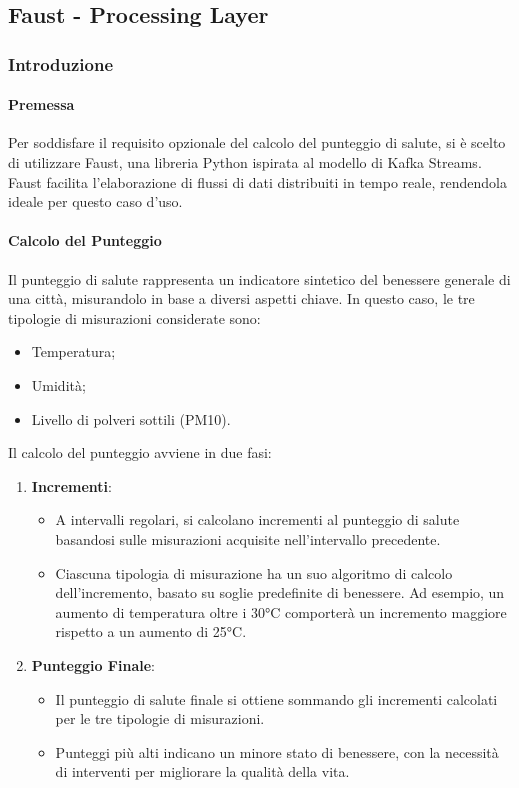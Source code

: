 \subsection{Faust - Processing Layer}
\subsubsection{Introduzione}
\paragraph*{Premessa}

Per soddisfare il requisito opzionale del calcolo del punteggio di salute, si è scelto di utilizzare Faust, una libreria Python ispirata al modello di Kafka Streams. Faust facilita l'elaborazione di flussi di dati distribuiti in tempo reale, rendendola ideale per questo caso d'uso.

\paragraph*{Calcolo del Punteggio}
Il punteggio di salute rappresenta un indicatore sintetico del benessere generale di una città, misurandolo in base a diversi aspetti chiave. In questo caso, le tre tipologie di misurazioni considerate sono:
\begin{itemize}
    \item Temperatura;
    \item Umidità;
    \item Livello di polveri sottili (PM10).
\end{itemize}

Il calcolo del punteggio avviene in due fasi:
\begin{enumerate}
    \item \textbf{Incrementi}: 
    \begin{itemize}
        \item A intervalli regolari, si calcolano incrementi al punteggio di salute basandosi sulle misurazioni acquisite nell'intervallo precedente.
        \item Ciascuna tipologia di misurazione ha un suo algoritmo di calcolo dell'incremento, basato su soglie predefinite di benessere. Ad esempio, un aumento di temperatura oltre i 30°C comporterà un incremento maggiore rispetto a un aumento di 25°C.
    \end{itemize}
    \item \textbf{Punteggio Finale}:
    \begin{itemize}
        \item Il punteggio di salute finale si ottiene sommando gli incrementi calcolati per le tre tipologie di misurazioni.
        \item Punteggi più alti indicano un minore stato di benessere, con la necessità di interventi per migliorare la qualità della vita.
    \end{itemize}
\end{enumerate}


